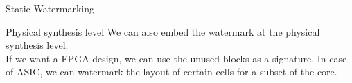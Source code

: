 \begin{section}{Static Watermarking}
  \begin{subsection}{Physical synthesis level}
    We can also embed the watermark at the physical synthesis level.\\
    If we want a FPGA design, we can use the unused blocks as a signature. In case of ASIC, we can watermark
    the layout of certain cells for a subset of the core.
  \end{subsection}


\end{section}
